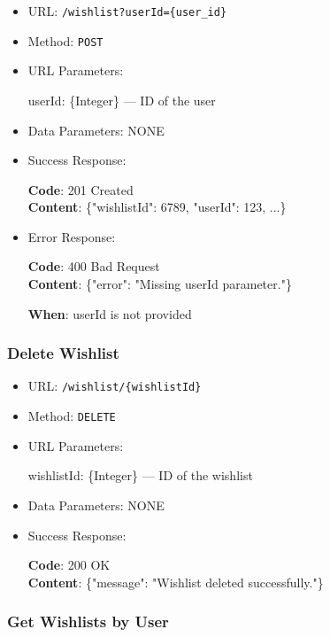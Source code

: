 \begin{itemize}
    \item URL: \texttt{/wishlist?userId=\{user\_id\}}
    \item Method: \texttt{POST}
    \item URL Parameters:

    userId: \{Integer\} — ID of the user

    \item Data Parameters: NONE

    \item Success Response: \newline

    \textbf{Code}: 201 Created \\
    \textbf{Content}: \{"wishlistId": 6789, "userId": 123, ...\}

    \item Error Response: \newline

    \textbf{Code}: 400 Bad Request \\
    \textbf{Content}: \{"error": "Missing userId parameter."\}

    \textbf{When}: userId is not provided
\end{itemize}

\subsubsection*{Delete Wishlist}

\begin{itemize}
    \item URL: \texttt{/wishlist/\{wishlistId\}}
    \item Method: \texttt{DELETE}
    \item URL Parameters:

    wishlistId: \{Integer\} — ID of the wishlist

    \item Data Parameters: NONE

    \item Success Response: \newline

    \textbf{Code}: 200 OK \\
    \textbf{Content}: \{"message": "Wishlist deleted successfully."\}
\end{itemize}

\subsubsection*{Get Wishlists by User}

